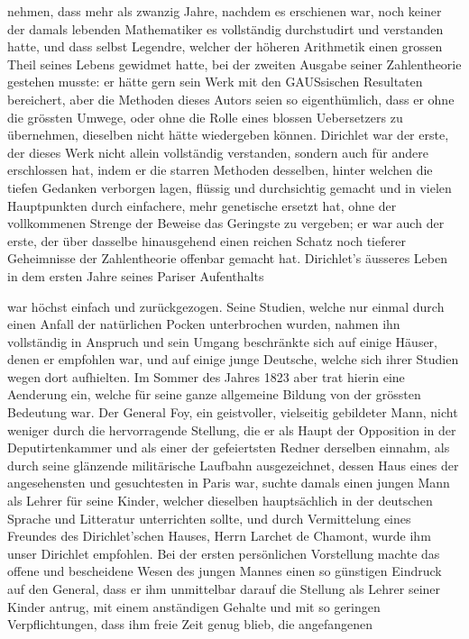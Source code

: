 \documentclass[11pt]{article}
\begin{document}
\noindent nehmen, dass mehr als zwanzig Jahre, nachdem es erschienen war, noch keiner der damals lebenden Mathematiker es vollständig durchstudirt und verstanden hatte, und dass selbst Legendre, welcher der höheren Arithmetik einen grossen Theil seines Lebens gewidmet hatte, bei der zweiten Ausgabe seiner Zahlentheorie gestehen musste: er hätte gern sein Werk mit den GAUSsischen Resultaten bereichert, aber die Methoden dieses Autors seien so eigenthümlich, dass er ohne die grössten Umwege, oder ohne die Rolle eines blossen Uebersetzers zu übernehmen, dieselben nicht hätte wiedergeben können. Dirichlet war der erste, der dieses Werk nicht allein vollständig verstanden, sondern auch für andere erschlossen hat, indem er die starren Methoden desselben, hinter welchen die tiefen Gedanken verborgen lagen, flüssig und durchsichtig gemacht und in vielen Hauptpunkten durch einfachere, mehr genetische ersetzt hat, ohne der vollkommenen Strenge der Beweise das Geringste zu vergeben; er war auch der erste, der über dasselbe hinausgehend einen reichen Schatz noch tieferer Geheimnisse der Zahlentheorie offenbar gemacht hat. Dirichlet’s äusseres Leben in dem ersten Jahre seines Pariser Aufenthalts
\par

\noindent war höchst einfach und zurückgezogen. Seine Studien, welche nur einmal durch einen Anfall der natürlichen Pocken unterbrochen wurden, nahmen ihn vollständig in Anspruch und sein Umgang beschränkte sich auf einige Häuser, denen er empfohlen war, und auf einige junge Deutsche, welche sich ihrer Studien wegen dort aufhielten. Im Sommer des Jahres 1823 aber trat hierin eine Aenderung ein, welche für seine ganze allgemeine Bildung von der grössten Bedeutung war. Der General Foy, ein geistvoller, vielseitig gebildeter Mann, nicht weniger durch die hervorragende Stellung, die er als Haupt der Opposition in der Deputirtenkammer und als einer der gefeiertsten Redner derselben einnahm, als durch seine glänzende militärische Laufbahn ausgezeichnet, dessen Haus eines der angesehensten und gesuchtesten in Paris war, suchte damals einen jungen Mann als Lehrer für seine Kinder, welcher dieselben hauptsächlich in der deutschen Sprache und Litteratur unterrichten sollte, und durch Vermittelung eines Freundes des Dirichlet’schen Hauses, Herrn Larchet de Chamont, wurde ihm unser Dirichlet empfohlen. Bei der ersten persönlichen Vorstellung machte das offene und bescheidene Wesen des jungen Mannes einen so günstigen Eindruck auf den General, dass er ihm unmittelbar darauf die Stellung als Lehrer seiner Kinder antrug, mit einem anständigen Gehalte und mit so geringen Verpflichtungen, dass ihm freie Zeit genug blieb, die angefangenen 
\par
\end{document}
